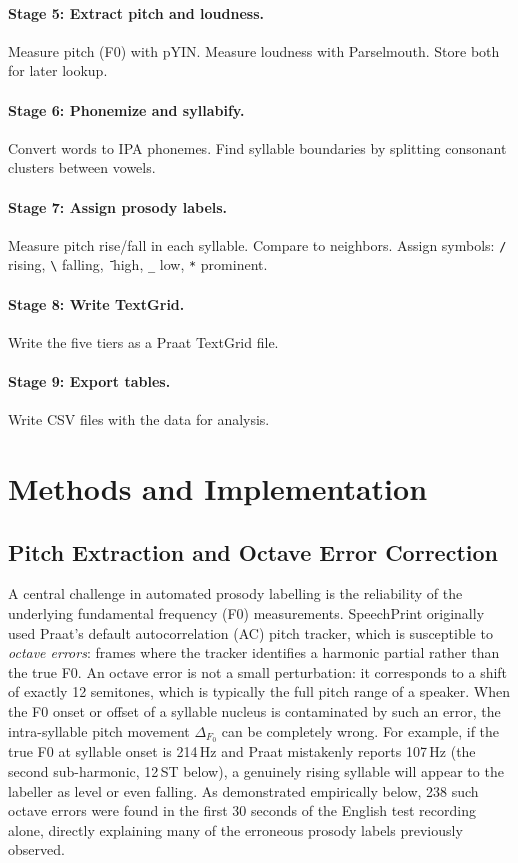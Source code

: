 \paragraph{Stage 5: Extract pitch and loudness.}
Measure pitch (F0) with pYIN. Measure loudness with Parselmouth. Store both for later lookup.

\paragraph{Stage 6: Phonemize and syllabify.}
Convert words to IPA phonemes. Find syllable boundaries by splitting consonant clusters between vowels.

\paragraph{Stage 7: Assign prosody labels.}
Measure pitch rise/fall in each syllable. Compare to neighbors. Assign symbols: \texttt{/} rising, \texttt{\textbackslash} falling, \texttt{\={}} high, \texttt{\_} low, \texttt{*} prominent.

\paragraph{Stage 8: Write TextGrid.}
Write the five tiers as a Praat TextGrid file.

\paragraph{Stage 9: Export tables.}
Write CSV files with the data for analysis.

\section{Methods and Implementation}

\subsection{Pitch Extraction and Octave Error Correction}
\label{sec:pitch_extraction}

A central challenge in automated prosody labelling is the reliability of the
underlying fundamental frequency (F0) measurements. SpeechPrint originally used
Praat's default autocorrelation (AC) pitch tracker, which is
susceptible to \emph{octave errors}: frames where the tracker identifies a
harmonic partial rather than the true F0. An octave error is not a small
perturbation: it corresponds to a shift of exactly 12 semitones, which is
typically the full pitch range of a speaker. When the F0 onset or offset of a
syllable nucleus is contaminated by such an error, the intra-syllable pitch
movement $\Delta_{F_0}$ can be completely wrong. For example, if the true F0 at
syllable onset is 214\,Hz and Praat mistakenly reports 107\,Hz (the second
sub-harmonic, 12\,ST below), a genuinely rising syllable will appear to the
labeller as level or even falling. As demonstrated empirically below, 238 such
octave errors were found in the first 30 seconds of the English test recording
alone, directly explaining many of the erroneous prosody labels previously
observed.

